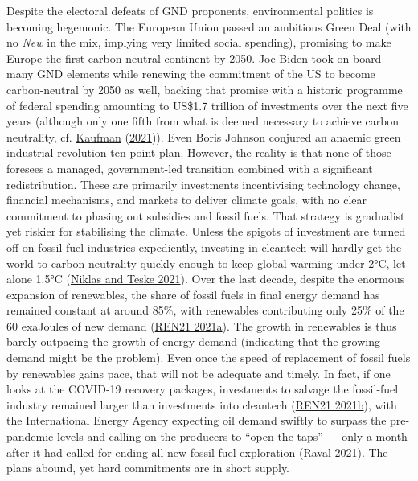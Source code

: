 \documentclass[a4paper, nobind]{templates/ociamthesis}
\begin{document}
Despite the electoral defeats of GND proponents, environmental politics is becoming hegemonic. The European Union passed an ambitious Green Deal (with no \emph{New} in the mix, implying very limited social spending), promising to make Europe the first carbon-neutral continent by 2050. Joe Biden took on board many GND elements while renewing the commitment of the US to become carbon-neutral by 2050 as well, backing that promise with a historic programme of federal spending amounting to US\$1.7 trillion of investments over the next five years (although only one fifth from what is deemed necessary to achieve carbon neutrality, cf. \protect\hyperlink{ref-kaufman_biden_2021}{Kaufman} (\protect\hyperlink{ref-kaufman_biden_2021}{2021})). Even Boris Johnson conjured an anaemic green industrial revolution ten-point plan. However, the reality is that none of those foresees a managed, government-led transition combined with a significant redistribution. These are primarily investments incentivising technology change, financial mechanisms, and markets to deliver climate goals, with no clear commitment to phasing out subsidies and fossil fuels. That strategy is gradualist yet riskier for stabilising the climate. Unless the spigots of investment are turned off on fossil fuel industries expediently, investing in cleantech will hardly get the world to carbon neutrality quickly enough to keep global warming under 2°C, let alone 1.5°C (\protect\hyperlink{ref-niklas_even_2021}{Niklas and Teske 2021}). Over the last decade, despite the enormous expansion of renewables, the share of fossil fuels in final energy demand has remained constant at around 85\%, with renewables contributing only 25\% of the 60 exaJoules of new demand (\protect\hyperlink{ref-ren21_five_2021}{REN21 2021a}). The growth in renewables is thus barely outpacing the growth of energy demand (indicating that the growing demand might be the problem). Even once the speed of replacement of fossil fuels by renewables gains pace, that will not be adequate and timely. In fact, if one looks at the COVID-19 recovery packages, investments to salvage the fossil-fuel industry remained larger than investments into cleantech (\protect\hyperlink{ref-ren21_renewables_2021}{REN21 2021b}), with the International Energy Agency expecting oil demand swiftly to surpass the pre-pandemic levels and calling on the producers to ``open the taps'' --- only a month after it had called for ending all new fossil-fuel exploration (\protect\hyperlink{ref-raval_oil_2021}{Raval 2021}). The plans abound, yet hard commitments are in short supply.
\end{document}
